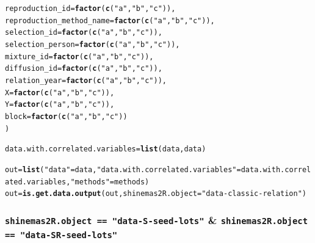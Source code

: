 \documentclass{article}\usepackage[]{graphicx}\usepackage[]{color}
\makeatletter
\newcommand{\hlstr}[1]{\textcolor[rgb]{0.192,0.494,0.8}{#1}}%
\newcommand{\hlstd}[1]{\textcolor[rgb]{0.345,0.345,0.345}{#1}}%
\newcommand{\hlkwb}[1]{\textcolor[rgb]{0.69,0.353,0.396}{#1}}%
\newcommand{\hlkwc}[1]{\textcolor[rgb]{0.333,0.667,0.333}{#1}}%
\newcommand{\hlkwd}[1]{\textcolor[rgb]{0.737,0.353,0.396}{\textbf{#1}}}%
\newenvironment{kframe}{%
 \def\at@end@of@kframe{}%
 \ifinner\ifhmode%
  \def\at@end@of@kframe{\end{minipage}}%
  \begin{minipage}{\columnwidth}%
 \fi\fi%
 \def\FrameCommand##1{\hskip\@totalleftmargin \hskip-\fboxsep
 \colorbox{shadecolor}{##1}\hskip-\fboxsep
     \hskip-\linewidth \hskip-\@totalleftmargin \hskip\columnwidth}%
 \MakeFramed {\advance\hsize-\width
   \@totalleftmargin\z@ \linewidth\hsize
   \@setminipage}}%
 {\par\unskip\endMakeFramed%
 \at@end@of@kframe}
\newenvironment{knitrout}{}{} %
\makeatother
\begin{document}
\begin{appendices}
\begin{knitrout}
\begin{kframe}
\begin{alltt}
        \hlkwc{reproduction_id} \hlstd{=} \hlkwd{factor}\hlstd{(}\hlkwd{c}\hlstd{(}\hlstr{"a"}\hlstd{,} \hlstr{"b"}\hlstd{,} \hlstr{"c"}\hlstd{)),}
        \hlkwc{reproduction_method_name} \hlstd{=} \hlkwd{factor}\hlstd{(}\hlkwd{c}\hlstd{(}\hlstr{"a"}\hlstd{,} \hlstr{"b"}\hlstd{,} \hlstr{"c"}\hlstd{)),}
        \hlkwc{selection_id} \hlstd{=} \hlkwd{factor}\hlstd{(}\hlkwd{c}\hlstd{(}\hlstr{"a"}\hlstd{,} \hlstr{"b"}\hlstd{,} \hlstr{"c"}\hlstd{)),}
        \hlkwc{selection_person} \hlstd{=} \hlkwd{factor}\hlstd{(}\hlkwd{c}\hlstd{(}\hlstr{"a"}\hlstd{,} \hlstr{"b"}\hlstd{,} \hlstr{"c"}\hlstd{)),}
        \hlkwc{mixture_id} \hlstd{=} \hlkwd{factor}\hlstd{(}\hlkwd{c}\hlstd{(}\hlstr{"a"}\hlstd{,} \hlstr{"b"}\hlstd{,} \hlstr{"c"}\hlstd{)),}
        \hlkwc{diffusion_id} \hlstd{=} \hlkwd{factor}\hlstd{(}\hlkwd{c}\hlstd{(}\hlstr{"a"}\hlstd{,} \hlstr{"b"}\hlstd{,} \hlstr{"c"}\hlstd{)),}
        \hlkwc{relation_year} \hlstd{=} \hlkwd{factor}\hlstd{(}\hlkwd{c}\hlstd{(}\hlstr{"a"}\hlstd{,} \hlstr{"b"}\hlstd{,} \hlstr{"c"}\hlstd{)),}
        \hlkwc{X} \hlstd{=} \hlkwd{factor}\hlstd{(}\hlkwd{c}\hlstd{(}\hlstr{"a"}\hlstd{,} \hlstr{"b"}\hlstd{,} \hlstr{"c"}\hlstd{)),}
        \hlkwc{Y} \hlstd{=} \hlkwd{factor}\hlstd{(}\hlkwd{c}\hlstd{(}\hlstr{"a"}\hlstd{,} \hlstr{"b"}\hlstd{,} \hlstr{"c"}\hlstd{)),}
        \hlkwc{block} \hlstd{=} \hlkwd{factor}\hlstd{(}\hlkwd{c}\hlstd{(}\hlstr{"a"}\hlstd{,} \hlstr{"b"}\hlstd{,} \hlstr{"c"}\hlstd{))}
        \hlstd{)}

\hlstd{data.with.correlated.variables} \hlkwb{=} \hlkwd{list}\hlstd{(data, data)}

\hlstd{out} \hlkwb{=} \hlkwd{list}\hlstd{(}\hlstr{"data"} \hlstd{= data,} \hlstr{"data.with.correlated.variables"} \hlstd{= data.with.correlated.variables,} \hlstr{"methods"} \hlstd{= methods)}
\hlstd{out} \hlkwb{=} \hlkwd{is.get.data.output}\hlstd{(out,} \hlkwc{shinemas2R.object} \hlstd{=} \hlstr{"data-classic-relation"}\hlstd{)}
\end{alltt}


{\ttfamily\noindent\itshape{}}\end{kframe}
\end{knitrout}



\subsubsection{\texttt{shinemas2R.object == "data-S-seed-lots"} \& \texttt{shinemas2R.object == "data-SR-seed-lots"}}


\end{appendices}
\end{document}
